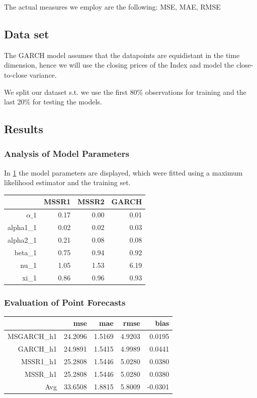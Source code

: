 \documentclass[11pt,a4paper]{article}
\begin{document}
The actual measures we employ are the following: \ac{MSE}, \ac{MAE}, \ac{RMSE}

\subsection{Data set}
The GARCH model assumes that the datapoints are equidistant in the time dimension, hence we will use the closing prices of the Index and model the close-to-close variance.

We split our dataset s.t. we use the first 80\% observations for training and the last 20\% for testing the models.


\subsection{Results}
\subsubsection{Analysis of Model Parameters}
In \cref{tab:model-params} the model parameters are displayed, which were fitted using a maximum likelihood estimator and the training set.

\begin{table}[ht]
\label{tab:model-params}
\centering
\begin{tabular}{rrrr}
  \hline
 & MSSR1 & MSSR2 & GARCH \\ 
  \hline
$\alpha\_1$ & 0.17 & 0.00 & 0.01 \\ 
  alpha1\_1 & 0.02 & 0.02 & 0.03 \\ 
  alpha2\_1 & 0.21 & 0.08 & 0.08 \\ 
  beta\_1 & 0.75 & 0.94 & 0.92 \\ 
  nu\_1 & 1.05 & 1.53 & 6.19 \\ 
  xi\_1 & 0.86 & 0.96 & 0.93 \\ 
   \hline
\end{tabular}
\end{table}




\subsubsection{Evaluation of Point Forecasts}


\begin{table}[ht]
\centering
\begin{tabular}{rrrrr}
  \hline
 & mse & mae & rmse & bias \\ 
  \hline
MSGARCH\_h1 & 24.2096 & 1.5169 & 4.9203 & 0.0195 \\ 
  GARCH\_h1 & 24.9891 & 1.5415 & 4.9989 & 0.0441 \\ 
  MSSR1\_h1 & 25.2808 & 1.5446 & 5.0280 & 0.0380 \\ 
  MSSR\_h1 & 25.2808 & 1.5446 & 5.0280 & 0.0380 \\ 
  Avg & 33.6508 & 1.8815 & 5.8009 & -0.0301 \\ 
   \hline
\end{tabular}
\end{table}
\end{document}
